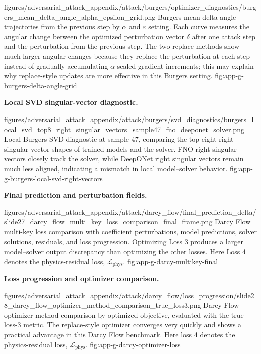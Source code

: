 \appendixattackfig
  {figures/adversarial_attack_appendix/attack/burgers/optimizer_diagnostics/burgers_mean_delta_angle_alpha_epsilon_grid.png}
  {Burgers mean delta-angle trajectories from the previous step by $\alpha$ and
  $\varepsilon$ setting. Each curve measures the angular change between the
  optimized perturbation vector $\delta$ after one attack step and the
  perturbation from the previous step. The two replace methods show much larger
  angular changes because they replace the perturbation at each step instead of
  gradually accumulating $\alpha$-scaled gradient increments; this may explain
  why replace-style updates are more effective in this Burgers setting.}
  {fig:app-g-burgers-delta-angle-grid}

\noindent\textbf{Local SVD singular-vector diagnostic.}

\appendixattackfig
  {figures/adversarial_attack_appendix/attack/burgers/svd_diagnostics/burgers_local_svd_top8_right_singular_vectors_sample47_fno_deeponet_solver.png}
  {Local Burgers SVD diagnostic at sample 47, comparing the top eight right
  singular-vector shapes of trained models and the solver. FNO right singular
  vectors closely track the solver, while DeepONet right singular vectors remain
  much less aligned, indicating a mismatch in local model--solver behavior.}
  {fig:app-g-burgers-local-svd-right-vectors}

\FloatBarrier
{}

\noindent\textbf{Final prediction and perturbation fields.}

\appendixattackfig
  {figures/adversarial_attack_appendix/attack/darcy_flow/final_prediction_delta/slide27_darcy_flow_multi_key_loss_comparison_final_frame.png}
  {Darcy Flow multi-key loss comparison with coefficient perturbations, model
  predictions, solver solutions, residuals, and loss progression. Optimizing
  Loss 3 produces a larger model--solver output discrepancy than optimizing the
  other losses. Here Loss 4 denotes the physics-residual loss,
  $\mathcal{L}_{\mathrm{phys}}$.}
  {fig:app-g-darcy-multikey-final}

\clearpage
\noindent\textbf{Loss progression and optimizer comparison.}

\appendixattackfigstacked
  {figures/adversarial_attack_appendix/attack/darcy_flow/loss_progression/slide28_darcy_flow_optimizer_method_comparison_true_loss3.png}
  {Darcy Flow optimizer-method comparison by optimized objective, evaluated
  with the true loss-3 metric. The replace-style optimizer converges very
  quickly and shows a practical advantage in this Darcy Flow benchmark. Here
  loss 4 denotes the physics-residual loss, $\mathcal{L}_{\mathrm{phys}}$.}
  {fig:app-g-darcy-optimizer-loss}

